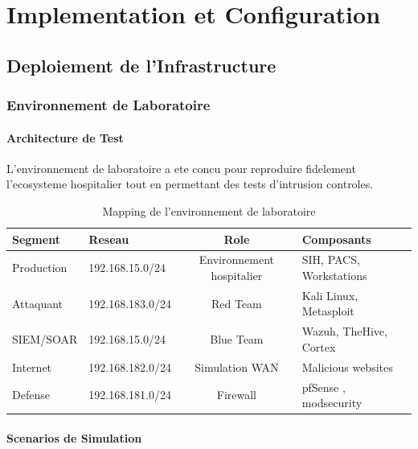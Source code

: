 \chapter{Implementation et Configuration}

\section{Deploiement de l'Infrastructure}

\subsection{Environnement de Laboratoire}

\subsubsection{Architecture de Test}

L'environnement de laboratoire a ete concu pour reproduire fidelement l'ecosysteme hospitalier tout en permettant des tests d'intrusion controles.

\begin{table}[H]
  \centering
  \caption{Mapping de l'environnement de laboratoire}
  \begin{tabular}{|l|l|c|l|}
    \hline
    \textbf{Segment} & \textbf{Reseau}  & \textbf{Role}             & \textbf{Composants}     \\
    \hline
    Production       & 192.168.15.0/24  & Environnement hospitalier & SIH, PACS, Workstations \\
    \hline
    Attaquant        & 192.168.183.0/24 & Red Team                  & Kali Linux, Metasploit  \\
    \hline
    SIEM/SOAR        & 192.168.15.0/24  & Blue Team                 & Wazuh, TheHive, Cortex  \\
    \hline
    Internet         & 192.168.182.0/24 & Simulation WAN            & Malicious websites      \\
    \hline
    Defense          & 192.168.181.0/24 & Firewall                  & pfSense , modsecurity   \\
    \hline
  \end{tabular}
\end{table}

\subsubsection{Scenarios de Simulation}

